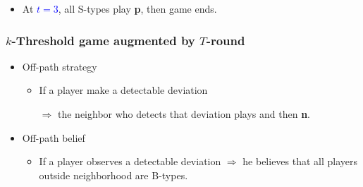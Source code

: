 \documentclass[9pt,handout]{beamer}
\begin{document}
\begin{frame}
\begin{itemize}
\begin{itemize}
\pause
\item At \textcolor{blue}{$t=3$}, all S-types play \textbf{p}, then game ends.

\end{itemize}

\end{itemize}



\end{frame}


\begin{frame}
  \frametitle{$k$-Threshold game augmented by $T$-round }


\begin{itemize}

\item Off-path strategy
\begin{itemize}
\item If a player make a detectable deviation 

$\Rightarrow$ the neighbor who detects that deviation plays  and then \textbf{n}.
\end{itemize}
\item Off-path belief
\begin{itemize}
\item If a player observes a detectable deviation $\Rightarrow$ he believes that all players outside neighborhood are B-types. 
\end{itemize}
\end{itemize}



\end{frame}
\end{document}
